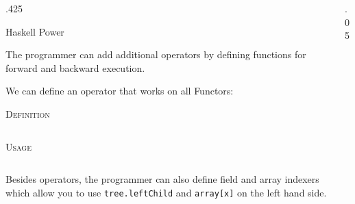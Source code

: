 \documentclass[final,hyperref={pdfpagelabels=false}]{beamer}
\newcommand\sepsize{.05\textwidth}
\newcommand\colsize{.425\textwidth}
\newcommand{\code}[1]{\inputminted[frame=lines,framesep=1cm,baselinestretch=.9,linenos,fontsize=\scriptsize]{haskell}{code/#1.hs}}
\begin{document}
\begin{frame}[t]
\begin{columns}[t]
\begin{column}{\colsize}
\begin{block}{Haskell Power}
	\begin{itemize}
		\item The programmer can add additional operators by defining functions for forward and backward execution.
		\item We can define an operator that works on all Functors:
		\begin{center}
		\textsc{\small Definition}\\ \vspace{1cm}
		\begin{minipage}{.8\textwidth}
			\code{functor_def}
		\end{minipage}
		\vspace{1cm}
		\item \textsc{\small Usage}\\ \vspace{1cm}
		\begin{minipage}{.8\textwidth}
			\code{functor_usage}
		\end{minipage}
		\end{center}
		\vspace{1cm}
		\item Besides operators, the programmer can also define field and array indexers which allow you to use \texttt{tree.leftChild} and \texttt{array[x]} on the left hand side.
	\end{itemize}
\end{block}


\end{column} %

\begin{column}{\sepsize}\end{column} %

\end{columns} %

\end{frame} %
\end{document}

